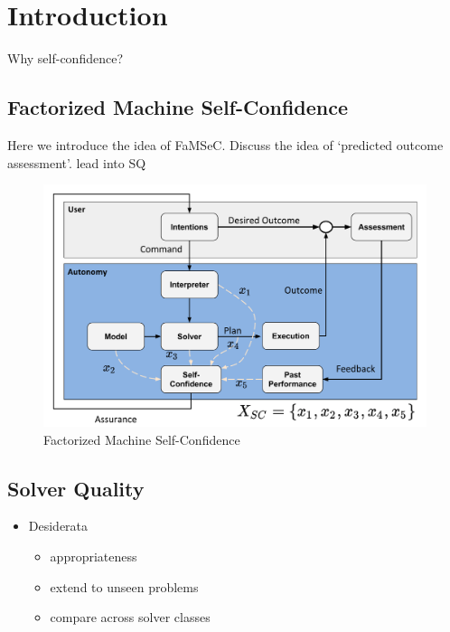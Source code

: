 \section{Introduction}
Why self-confidence?

\subsection{Factorized Machine Self-Confidence}
Here we introduce the idea of FaMSeC. Discuss the idea of `predicted outcome assessment'. lead into SQ

\begin{figure}[tbp]
    \centering
    \includegraphics[width=0.65\linewidth]{Figures/SC_flowchart.pdf}
    \caption{Factorized Machine Self-Confidence}
    \label{fig:famsec}
\end{figure}

\subsection{Solver Quality}
\begin{itemize}
    \item Desiderata
    \begin{itemize}
        \item appropriateness
        \item extend to unseen problems
        \item compare across solver classes
    \end{itemize}
\end{itemize}
